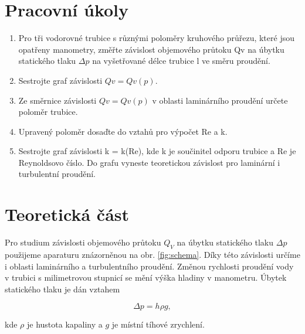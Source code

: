 \section{Pracovní úkoly}

\begin{enumerate}
\item Pro tři vodorovné trubice s různými poloměry kruhového průřezu, které jsou opatřeny manometry, změřte závislost objemového průtoku Qv na úbytku statického tlaku \(\Delta p\) na vyšetřované délce trubice l ve směru proudění.

\item Sestrojte graf závislosti \(Qv = Qv(p).\)

\item Ze směrnice závislosti \(Qv = Qv(p)\) v oblasti laminárního proudění určete poloměr trubice.

\item Upravený poloměr dosaďte do vztahů pro výpočet Re a k.

\item Sestrojte graf závislosti k = k(Re), kde k je součinitel odporu trubice a Re je Reynoldsovo číslo. Do grafu vyneste teoretickou závislost pro laminární i turbulentní proudění.
\end{enumerate}

\section{Teoretická část}

    Pro studium závislosti objemového průtoku \(Q_V\) na úbytku statického tlaku \(\Delta p\) použijeme aparaturu znázorněnou na obr. \ref{fig:schema}. Díky této závislosti určíme i oblasti laminárního a turbulentního proudění. Změnou rychlosti proudění vody v trubici s milimetrovou stupnicí se mění výška hladiny v manometru. Úbytek statického tlaku je dán vztahem

    \begin{equation}
        \Delta p = h\rho g,
    \end{equation}

    kde \(\rho\) je hustota kapaliny a \(g\) je místní tíhové zrychlení.

